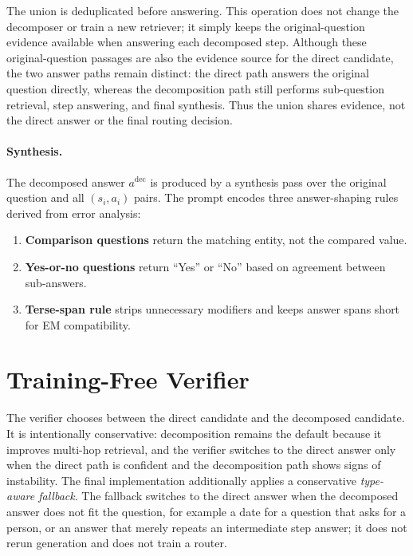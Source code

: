 The union is deduplicated before answering. This operation does not change the decomposer or train a new retriever; it simply keeps the original-question evidence available when answering each decomposed step. Although these original-question passages are also the evidence source for the direct candidate, the two answer paths remain distinct: the direct path answers the original question directly, whereas the decomposition path still performs sub-question retrieval, step answering, and final synthesis. Thus the union shares evidence, not the direct answer or the final routing decision.

\paragraph{Synthesis.}
The decomposed answer $a^{\mathrm{dec}}$ is produced by a synthesis pass over the original question and all $(s_i,a_i)$ pairs. The prompt encodes three answer-shaping rules derived from error analysis:

\begin{enumerate}
    \item \textbf{Comparison questions} return the matching entity, not the compared value.
    \item \textbf{Yes-or-no questions} return ``Yes'' or ``No'' based on agreement between sub-answers.
    \item \textbf{Terse-span rule} strips unnecessary modifiers and keeps answer spans short for EM compatibility.
\end{enumerate}

\section{Training-Free Verifier}
\label{sec:verifier}

The verifier chooses between the direct candidate and the decomposed candidate. It is intentionally conservative: decomposition remains the default because it improves multi-hop retrieval, and the verifier switches to the direct answer only when the direct path is confident and the decomposition path shows signs of instability. The final implementation additionally applies a conservative \emph{type-aware fallback}. The fallback switches to the direct answer when the decomposed answer does not fit the question, for example a date for a question that asks for a person, or an answer that merely repeats an intermediate step answer; it does not rerun generation and does not train a router.


